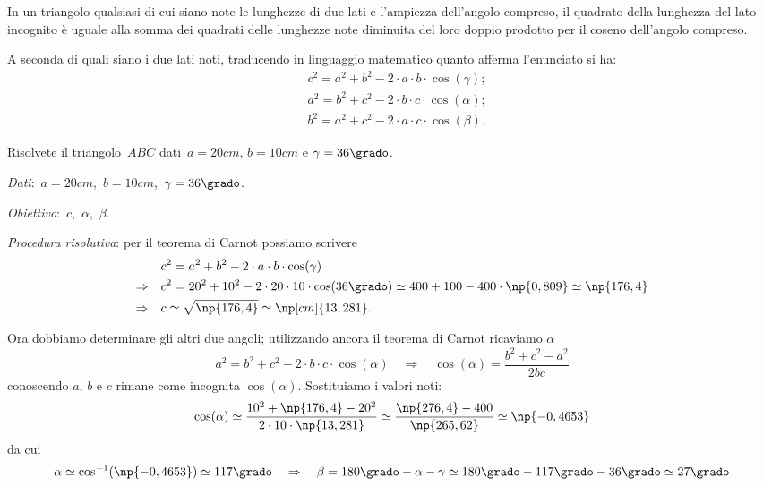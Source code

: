 \begin{teorema}
In un triangolo qualsiasi di cui siano note le lunghezze di due lati e l'ampiezza dell'angolo compreso, il quadrato della lunghezza
del lato incognito è uguale alla somma dei quadrati delle lunghezze note diminuita del loro doppio prodotto per il coseno dell'angolo compreso.

A seconda di quali siano i due lati noti, traducendo in linguaggio matematico quanto afferma l'enunciato si ha:
\begin{align*}
&c^{2}=a^{2}+b^{2}-2\cdot a\cdot b\cdot \cos(\gamma);\\
&a^{2}=b^{2}+c^{2}-2\cdot b\cdot c\cdot \cos(\alpha);\\
&b^{2}=a^{2}+c^{2}-2\cdot a\cdot c\cdot \cos(\beta).
\end{align*}
\end{teorema}

\begin{problema}
Risolvete il triangolo~$ABC$ dati~$a= 20\unit{cm}$, $b=10\unit{cm}$ e $\gamma=36\grado$.
\end{problema}

\emph{Dati}:~$a=20\unit{cm}$,\quad~$b=10\unit{cm}$,\quad~$\gamma=36\grado$.

\emph{Obiettivo}:~$c$,\quad~$\alpha$,\quad~$\beta$.

\emph{Procedura risolutiva}:
per il teorema di Carnot possiamo scrivere
\begin{align*}
&c^{2}=a^{2}+b^{2}-2\cdot a\cdot b\cdot \cos (\gamma)\\
\Rightarrow\quad &c^{2}=20^{2}+10^{2}-2\cdot 20\cdot 10\cdot \cos(36\grado)\simeq 400+100-400\cdot \np{0,809}\simeq \np{176,4}\\
\Rightarrow\quad &c\simeq \sqrt{\np{176,4}}\simeq \np[cm]{13,281}.
\end{align*}

Ora dobbiamo determinare gli altri due angoli; utilizzando ancora il teorema di Carnot ricaviamo $\alpha$
\[a^{2}=b^{2}+c^{2}-2\cdot b\cdot c\cdot \cos(\alpha) \quad\Rightarrow\quad \cos(\alpha)= \dfrac{b^2+c^2-a^2}{2bc}\]
conoscendo $a$, $b$ e $c$ rimane come incognita $\cos(\alpha)$. Sostituiamo i valori noti:
\[\cos(\alpha)\simeq \dfrac{10^2+\np{176,4}-20^2}{2\cdot 10 \cdot \np{13,281}}\simeq\frac{\np{276,4}-400}{\np{265,62}}\simeq\np{-0,4653}\]
da cui
\[\alpha\simeq \cos^{-1}(\np{-0,4653})\simeq 117\grado \quad\Rightarrow\quad \beta = 180\grado - \alpha -\gamma \simeq 180\grado -117\grado - 36\grado \simeq 27\grado\]

